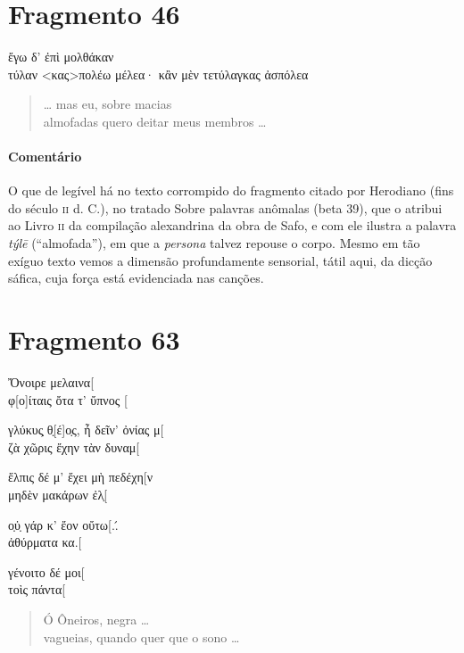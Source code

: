 {\section{Fragmento 46}

\begin{gkverse}
ἔγω δ’ ἐπὶ μολθάκαν\\
τύλαν <κας>πολέω \dagger{}μέλεα· κἂν μὲν τετύλαγκας ἀσπόλεα\dagger{}
\end{gkverse}

\begin{verse}
\ldots{} mas eu, sobre macias\\
almofadas quero deitar meus membros \ldots{}
\end{verse}

{\paragraph{Comentário} O que de legível há no texto corrompido do fragmento citado por Herodiano (fins do século \textsc{ii} d. C.), no tratado Sobre palavras anômalas (beta 39), que o atribui ao Livro \textsc{ii} da compilação alexandrina da obra de Safo, e com ele ilustra a palavra \textit{týlē} (``almofada''), em que a \textit{persona} talvez repouse o corpo. Mesmo em tão exíguo texto vemos a dimensão profundamente sensorial, tátil aqui, da dicção sáfica, cuja força está evidenciada nas canções.}



\pagebreak
\section{Fragmento 63}

\begin{gkverse}
Ὄνοιρε μελαινα[\\
φ[ο]ίταις ὄτα τ’ ὔπνος [

γλύκυς̣ θ̣[έ]ο̣ς, ἦ δεῖν’ ὀνίας μ[\\
ζὰ χῶρις ἔχην τὰν δυναμ[

ἔλπις δέ μ’ ἔχει μὴ πεδέχη[ν\\
μηδὲν μακάρων ἐλ̣[

ο̣ὐ̣ γάρ κ’ ἔον οὔτω[..́   \\
ἀθύρματα κα.[

γένοιτο δέ μοι[\\
τοὶς πάντα[
\end{gkverse}

\begin{verse}
Ó Ôneiros, negra \ldots{}\\
vagueias, quando quer que o sono \ldots{}


\end{verse}}
